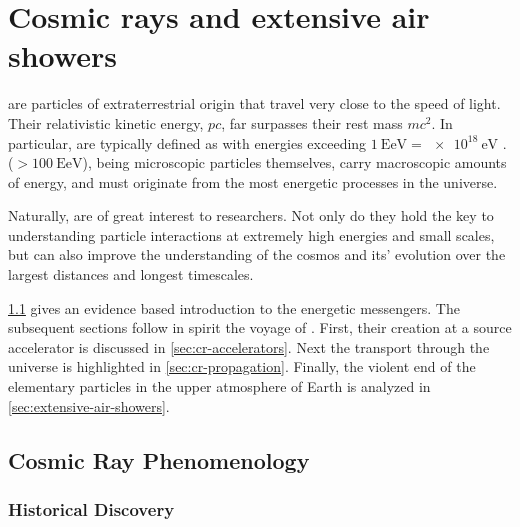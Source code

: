 
\chapter{Cosmic rays and extensive air showers}
\label{chap:cosmic-rays}

\CRs are particles of extraterrestrial origin that travel very close to the 
speed of light. Their relativistic kinetic energy, $pc$, far surpasses their 
rest mass $mc^2$. In particular, \UHECRs are typically defined as \CRs with 
energies exceeding $\SI{1}{\exa\eV} = \SI{e18}{\eV}$ 
\cite{alvesbatistaOpenQuestionsCR2019}. \EHECRs($>\SI{100}{\exa\eV}$), being
microscopic particles themselves, carry macroscopic amounts of energy, and must
originate from the most energetic processes in the universe. 

Naturally, \CRs are of great interest to researchers. Not only do they hold the
key to understanding particle interactions at extremely high energies and small
scales, but can also improve the understanding of the cosmos and its' evolution
over the largest distances and longest timescales.

\cref{sec:cr-phenomenology} gives an evidence based introduction to the
energetic messengers. The subsequent sections follow in spirit the voyage of
\CRs. First, their creation at a source accelerator is discussed in 
\cref{sec:cr-accelerators}. Next the \CR transport through the universe is 
highlighted in \cref{sec:cr-propagation}. Finally, the violent end of the 
elementary particles in the upper atmosphere of Earth is analyzed in 
\cref{sec:extensive-air-showers}. 

\newpage
\section{Cosmic Ray Phenomenology}
\label{sec:cr-phenomenology}

\halflift

\subsection{Historical Discovery}
\label{ssec:cr-history}


